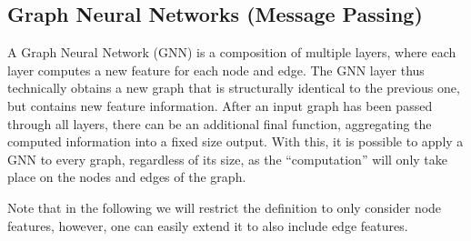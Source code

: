 \subsection{Graph Neural Networks (Message Passing)}\label{sec:GNN Defintion}
A Graph Neural Network (GNN) is a composition of multiple layers, where each layer computes a new feature for each node and edge. The GNN layer thus technically obtains a new graph that is structurally identical to the previous one, but contains new feature information. After an input graph has been passed through all layers, there can be an additional final function, aggregating the computed information into a fixed size output. With this, it is possible to apply a GNN to every graph, regardless of its size, as the ``computation'' will only take place on the nodes and edges of the graph.


Note that in the following we will restrict the definition to only consider node features, however, one can easily extend it to also include edge features.

